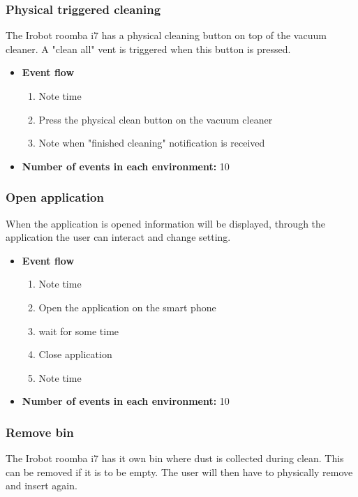\subsubsection{Physical triggered cleaning}
The Irobot roomba i7 has a physical cleaning button on top of the vacuum cleaner. A "clean all" vent is triggered when this button is pressed.

\begin{itemize}
    \item \textbf{Event flow} \begin{enumerate}
                                    \item Note time
                                    \item Press the physical clean button on the vacuum cleaner
                                    \item Note when "finished cleaning" notification is received
                                \end{enumerate}
    \item \textbf{Number of events in each environment:} 10
\end{itemize}

\subsubsection{Open application}
When the application is opened information will be displayed, through the application the user can interact and change setting. 

\begin{itemize}
    \item \textbf{Event flow} \begin{enumerate}
                                    \item Note time
                                    \item Open the application on the smart phone
                                    \item wait for some time
                                    \item Close application
                                    \item Note time
                                \end{enumerate}
    \item \textbf{Number of events in each environment:} 10
\end{itemize}

\subsubsection{Remove bin}
The Irobot roomba i7 has it own bin where dust is collected during clean. This can be removed if it is to be empty. The user will then have to physically remove and insert again. 

